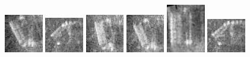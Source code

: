 \begin{figure}
    \includegraphics[width=0.15\textwidth]{chapters/images/dataset/all-class-images/can/can-205.jpg}
    \includegraphics[width=0.15\textwidth]{chapters/images/dataset/all-class-images/can/can-12.jpg}
    \includegraphics[width=0.15\textwidth]{chapters/images/dataset/all-class-images/can/can-293.jpg}
    \includegraphics[width=0.15\textwidth]{chapters/images/dataset/all-class-images/can/can-212.jpg}
    \includegraphics[width=0.15\textwidth]{chapters/images/dataset/all-class-images/can/can-361.jpg}
    \includegraphics[width=0.15\textwidth]{chapters/images/dataset/all-class-images/can/can-0.jpg}
    

\end{figure}
